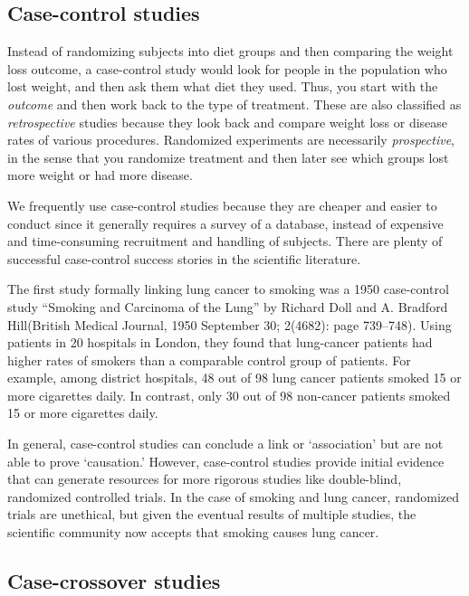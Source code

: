 \documentclass[11pt, chapterprefix=true]{scrbook}\usepackage[]{graphicx}\usepackage[]{color}
\begin{document}
\subsection{Case-control studies}

Instead of randomizing subjects into diet groups and then comparing the weight loss outcome, a case-control study would look for people in the population who lost weight, and then ask them what diet they used.  Thus, you start with the \textit{outcome} and then work back to the type of treatment.  These are also classified as \textit{retrospective} studies because they look back and compare weight loss or disease rates of various procedures.  Randomized experiments are necessarily \textit{prospective}, in the sense that you randomize treatment and then later see which groups lost more weight or had more disease.

We frequently use case-control studies because they are cheaper and easier to conduct since it generally requires a survey of a database, instead of expensive and time-consuming recruitment and handling of subjects.  There are plenty of successful case-control success stories in the scientific literature.

The first study formally linking lung cancer to smoking was a 1950 case-control study ``Smoking and Carcinoma of the Lung'' by Richard Doll and A. Bradford Hill(British Medical Journal, 1950 September 30; 2(4682): page 739--748).  Using patients in 20 hospitals in London, they found that lung-cancer patients had higher rates of smokers than a comparable control group of patients.   For example, among district hospitals, 48 out of 98 lung cancer patients smoked 15 or more cigarettes daily.  In contrast, only 30 out of 98 non-cancer patients smoked 15 or more cigarettes daily.  

In general, case-control studies can conclude a link or `association' but are not able to prove `causation.'   However, case-control studies provide initial evidence that can generate resources for more rigorous studies like double-blind, randomized controlled trials.  In the case of smoking and lung cancer, randomized trials are unethical, but given the eventual results of multiple studies, the scientific community now accepts that smoking causes lung cancer.  
\citep{doll1950}

\subsection{Case-crossover studies}
\end{document}
